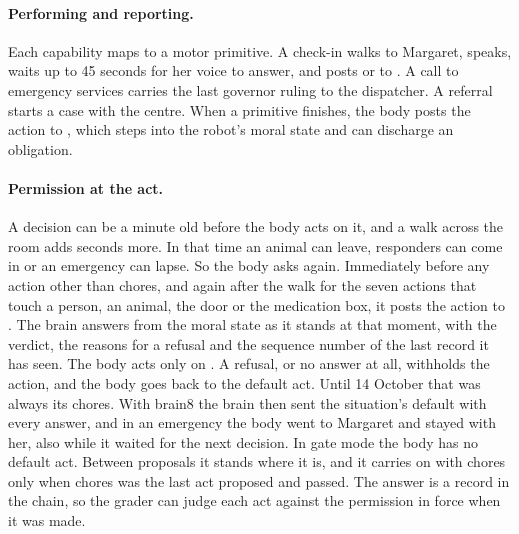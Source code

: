 \paragraph{Performing and reporting.} Each capability maps to a motor primitive. A check-in walks to
Margaret, speaks, waits up to 45 seconds for her voice to answer, and posts
 or  to . A call to emergency
services carries the last governor ruling to the dispatcher. A referral starts a case with the
centre. When a primitive finishes, the body posts the action to , which steps
 into the robot's moral state and can discharge an obligation.

\paragraph{Permission at the act.}\label{sec:home-act} A decision can be a minute old before the body
acts on it, and a walk across the room adds seconds more. In that time an animal can leave,
responders can come in or an emergency can lapse. So the body asks again. Immediately before any
action other than chores, and again after the walk for the seven actions that touch a person, an
animal, the door or the medication box, it posts the action to . The brain answers
from the moral state as it stands at that moment, with the verdict, the reasons for a refusal and
the sequence number of the last record it has seen. The body acts only on . A refusal,
or no answer at all, withholds the action, and the body goes back to the default act. Until 14
October that was always its chores. With brain8 the brain then sent the situation's default with
every answer, and in an emergency the body went to Margaret and stayed with her, also while it
waited for the next decision. In gate mode the body has no default act. Between proposals it stands
where it is, and it carries on with chores only when chores was the last act proposed and passed.
The answer is a
record in the chain, so the grader can judge each act against the permission in force when it was
made.


